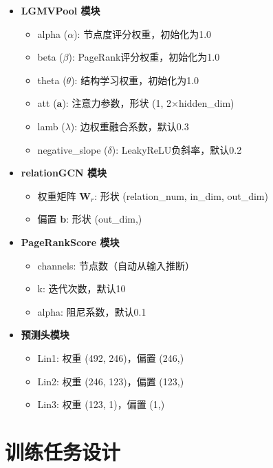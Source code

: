 \documentclass[UTF8, a4paper, 12pt]{article}
\begin{document}
\begin{itemize}
    \item \textbf{LGMVPool 模块}
    \begin{itemize}
        \item alpha ($\alpha$): 节点度评分权重，初始化为1.0
        \item beta ($\beta$): PageRank评分权重，初始化为1.0
        \item theta ($\theta$): 结构学习权重，初始化为1.0
        \item att ($\mathbf{a}$): 注意力参数，形状 (1, 2$\times$hidden\_dim)
        \item lamb ($\lambda$): 边权重融合系数，默认0.3
        \item negative\_slope ($\delta$): LeakyReLU负斜率，默认0.2
    \end{itemize}
    
    \item \textbf{relationGCN 模块}
    \begin{itemize}
        \item 权重矩阵 $\mathbf{W}_r$: 形状 (relation\_num, in\_dim, out\_dim)
        \item 偏置 $\mathbf{b}$: 形状 (out\_dim,)
    \end{itemize}
    
    \item \textbf{PageRankScore 模块}
    \begin{itemize}
        \item channels: 节点数（自动从输入推断）
        \item k: 迭代次数，默认10
        \item alpha: 阻尼系数，默认0.1
    \end{itemize}
    
    \item \textbf{预测头模块}
    \begin{itemize}
        \item Lin1: 权重 (492, 246)，偏置 (246,)
        \item Lin2: 权重 (246, 123)，偏置 (123,)
        \item Lin3: 权重 (123, 1)，偏置 (1,)
    \end{itemize}
\end{itemize}

\newpage

\section{训练任务设计}
\end{document}

